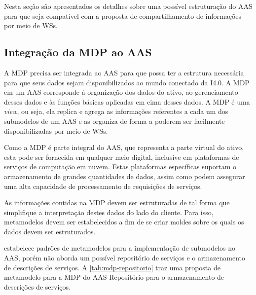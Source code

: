 	Nesta seção são apresentados os detalhes sobre uma possível estruturação do AAS para que seja compatível com a proposta de compartilhamento de informações por meio de WSs.
	
	\subsection{Integração da MDP ao AAS}
	
	A MDP precisa ser integrada ao AAS para que possa ter a estrutura necessária para que seus dados sejam disponibilizados ao mundo conectado da I4.0. A MDP em um AAS corresponde à organização dos dados do ativo, ao gerenciamento desses dados e às funções básicas aplicadas em cima desses dados. A MDP é uma \textit{view}, ou seja, ela replica e agrega as informações referentes a cada um dos submodelos de um AAS e as organiza de forma a poderem ser facilmente disponibilizadas por meio de WSs.
	
	Como a MDP é parte integral do AAS, que representa a parte virtual do ativo, esta pode ser fornecida em qualquer meio digital, inclusive em plataformas de serviços de computação em nuvem. Estas plataformas específicas suportam o armazenamento de grandes quantidades de dados, assim como podem assegurar uma alta capacidade de processamento de requisições de serviços.
	
	As informações contidas na MDP devem ser estruturadas de tal forma que simplifique a interpretação destes dados do lado do cliente. Para isso, metamodelos devem ser estabelecidos a fim de se criar moldes sobre os quais os dados devem ser estruturados.
	
	 estabelece padrões de metamodelos para a implementação de submodelos no AAS, porém não aborda um possível repositório de serviços e o armazenamento de descrições de serviços. A \autoref{tab:mdp-repositorio} traz uma proposta de metamodelo para a MDP do AAS Repositório para o armazenamento de descrições de serviços.
	
